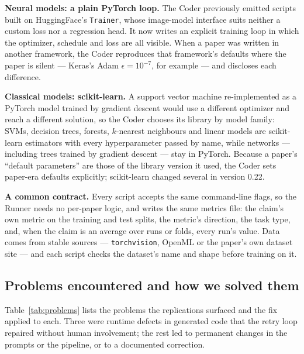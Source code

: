 \documentclass[11pt]{article}
\begin{document}
\textbf{Neural models: a plain PyTorch loop.} The Coder previously emitted scripts built on
HuggingFace's \texttt{Trainer}, whose image-model interface suits neither a custom loss nor a
regression head. It now writes an explicit training loop in which the optimizer, schedule and
loss are all visible. When a paper was written in another framework, the Coder reproduces that
framework's defaults where the paper is silent --- Keras's Adam $\epsilon = 10^{-7}$, for
example --- and discloses each difference.

\textbf{Classical models: scikit-learn.} A support vector machine re-implemented as a PyTorch
model trained by gradient descent would use a different optimizer and reach a different
solution, so the Coder chooses its library by model family: SVMs, decision trees, forests,
$k$-nearest neighbours and linear models are scikit-learn estimators with every hyperparameter
passed by name, while networks --- including trees trained by gradient descent --- stay in
PyTorch. Because a paper's ``default parameters'' are those of the library version it used, the
Coder sets paper-era defaults explicitly; scikit-learn changed several in version 0.22.

\textbf{A common contract.} Every script accepts the same command-line flags, so the Runner
needs no per-paper logic, and writes the same metrics file: the claim's own metric on the
training and test splits, the metric's direction, the task type, and, when the claim is an
average over runs or folds, every run's value. Data comes from stable sources ---
\texttt{torchvision}, OpenML or the paper's own dataset site --- and each script checks the
dataset's name and shape before training on it.

\subsection{Problems encountered and how we solved them}

Table~\ref{tab:problems} lists the problems the replications surfaced and the fix applied to
each. Three were runtime defects in generated code that the retry loop repaired without human
involvement; the rest led to permanent changes in the prompts or the pipeline, or to a
documented correction.
\end{document}
